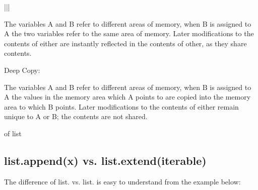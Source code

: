 \documentclass[letterpaper,12pt,english]{sphinxmanual}
\def\X{\mathbf{X}}
\begin{document}
\begin{savenotes}
\begin{tabular}[t]{|*{2}{\X{1}{2}|}}
\begin{footnote}[1]
\sphinxAtStartPar
The variables A and B refer to different areas of memory, when B is assigned to A the two variables refer to the same area of memory. Later modifications to the contents of either are instantly reflected in the contents of other, as they share contents.

\sphinxAtStartPar
Deep Copy:
\begin{quote}
\begin{sphinxfigure-in-table}
\centering

\noindent{}
\end{sphinxfigure-in-table}\relax
\end{quote}

\sphinxAtStartPar
The variables A and B refer to different areas of memory, when B is assigned to A the values in the memory area which A points to are copied into the memory area to which B points. Later modifications to the contents of either remain unique to A or B; the contents are not shared.
%
\end{footnote} of list
\\
\hline
\end{tabular}
\par
\sphinxattableend\end{savenotes}


\subsection{list.append(x) vs. list.extend(iterable)}
\label{\detokenize{struct:list-append-x-vs-list-extend-iterable}}
\sphinxAtStartPar
The difference of list.  vs. list.  is easy to understand
from the example below:

\sphinxAtStartPar
{}
\begin{quote}

\begin{sphinxVerbatim}[commandchars=\\\{\}]
  \PYG{p}{[}\PYG{p}{]}
  \PYG{p}{[}\PYG{p}{]}
\end{sphinxVerbatim}
\end{quote}
\end{document}
